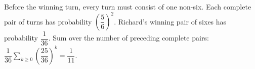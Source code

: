 Before the winning turn, every turn must consist of one non-six. Each complete pair of turns has probability $(\dfrac{5}{6})^2$. Richard's winning pair of sixes has probability $\dfrac{1}{36}$. Sum over the number of preceding complete pairs: $\dfrac{1}{36}\sum_{k\ge0}(\dfrac{25}{36})^k=\boxed{\dfrac{1}{11}}$.
